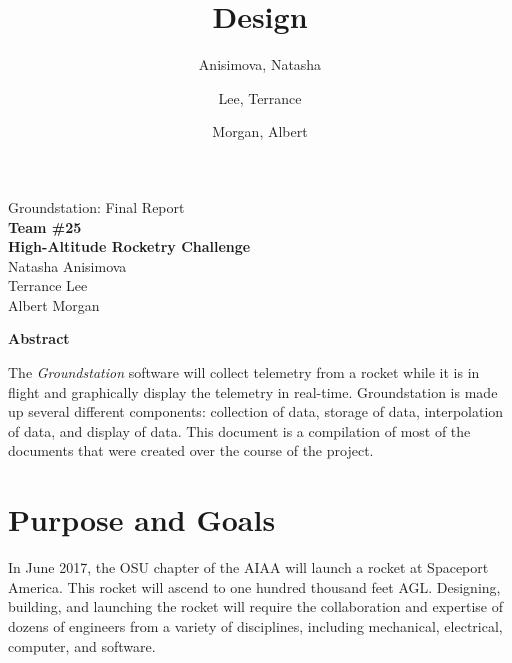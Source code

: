 \documentclass[10pt,draftclsnofoot,onecolumn]{IEEEtran}
\begin{document}
	\singlespace

	\title{\vspace{2in}Design}

	\author {
		Anisimova, Natasha
		\and
		Lee, Terrance
		\and
		Morgan, Albert
	}


	\pagestyle{empty}
	\vspace*{2in}
	\begin{center}
		\huge
		Groundstation: Final Report\\
		\normalsize
		\vspace{5mm}
		\textbf{
			Team \#25\\
			High-Altitude Rocketry Challenge\\
		}
		\vspace{1mm}
		Natasha Anisimova\\
		Terrance Lee\\
		Albert Morgan
	\end{center}

	\vspace{5mm}

	\begin{center}
		\textbf{Abstract}
	\end{center}


	The \textit{Groundstation} software will collect telemetry from a rocket while it is in flight and graphically display the telemetry in real-time. Groundstation is made up several different components: collection of data, storage of data, interpolation of data, and
	display of data.
	This document is a compilation of most of the documents that were created over the course of the project.

	\pagestyle{headings}

	\newpage

	\tableofcontents
	\newpage

\section{Purpose and Goals}
	In June 2017, the \ac{OSU} chapter of the
	\ac{AIAA} will launch a rocket at Spaceport America.
	This rocket will ascend to one hundred thousand feet \ac{AGL}.
	Designing, building, and launching the rocket will require the
	collaboration and expertise of dozens of engineers from a variety
	of disciplines, including mechanical, electrical, computer, and
	software.
\end{document}
